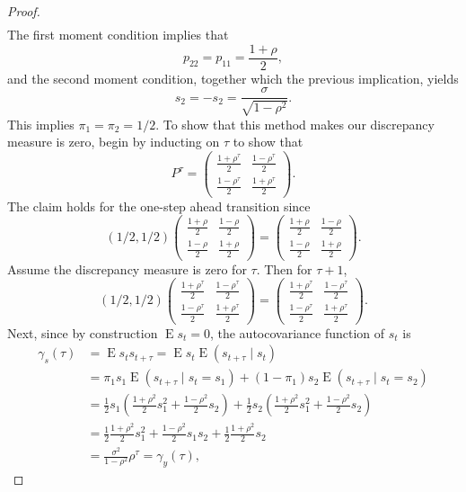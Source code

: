\documentclass[oneside,reqno]{amsart}
\DeclareMathOperator{\E}{E}
\theoremstyle{definition}
\begin{document}
\begin{enumerate}[label=(\roman*)]
\begin{proof}
\begin{align*}
\end{align*}
The first moment condition implies that 
\[
	p_{22} = p_{11} = \frac{1+\rho}{2},
\]
and the second moment condition, together which the previous implication, yields 
\[
	s_2 = -s_2 = \frac{\sigma}{\sqrt{1-\rho^2}}.
\]
This implies $\pi_1 = \pi_2 = 1/2$. To show that this method makes our discrepancy measure is zero, begin by inducting on $\tau$ to show that
\[
	P^\tau = \begin{pmatrix}
		\frac{1+\rho^\tau}{2} & \frac{1- \rho^\tau}{2} \\
		\frac{1-\rho^\tau}{2} & \frac{1+ \rho^\tau}{2}
	\end{pmatrix}.
\] 
The claim holds for the one-step ahead transition since
\[
	(1/2, 1/2)
	\begin{pmatrix}
		\frac{1+\rho}{2} & \frac{1- \rho}{2} \\
		\frac{1-\rho}{2} & \frac{1+ \rho}{2}
	\end{pmatrix}
	=\begin{pmatrix}
		\frac{1+\rho}{2} & \frac{1- \rho}{2} \\
		\frac{1-\rho}{2} & \frac{1+ \rho}{2}
	\end{pmatrix}.
\]
Assume the discrepancy measure is zero for $\tau$. Then for $\tau+1$,
\[
	(1/2, 1/2)
	\begin{pmatrix}
		\frac{1+\rho^\tau}{2} & \frac{1- \rho^\tau}{2} \\
		\frac{1-\rho^\tau}{2} & \frac{1+ \rho^\tau}{2}
	\end{pmatrix}
	=\begin{pmatrix}
		\frac{1+\rho^\tau}{2} & \frac{1- \rho^\tau}{2} \\
		\frac{1-\rho^\tau}{2} & \frac{1+ \rho^\tau}{2}
	\end{pmatrix}.
\]
Next, since by construction $\E s_t = 0$, the autocovariance function of $s_t$ is 
\begin{align*}
	\gamma_s(\tau) &= \E s_ts_{t+\tau} = \E s_t \E (s_{t+\tau} \mid s_t) \\
		&= \pi_1 s_1 \E (s_{t+\tau} \mid s_t = s_1) +  (1-\pi_1) s_2 \E (s_{t+\tau} \mid s_t = s_2) \\
		&= \frac{1}{2} s_1 \left(\frac{1+\rho^2}{2} s_1^2 + \frac{1-\rho^2}{2} s_2\right) + \frac{1}{2} s_2 \left(\frac{1+\rho^2}{2} s_1^2 + \frac{1-\rho^2}{2} s_2 \right) \\
		&= \frac{1}{2} \frac{1+\rho^2}{2} s_1^2 + \frac{1-\rho^2}{2} s_1s_2 + \frac{1}{2} \frac{1+\rho^2}{2} s_2 \\
		&= \frac{\sigma^2}{1-\rho^2}\rho^\tau = \gamma_y(\tau),

\end{align*}
\end{proof}
\end{enumerate}
\end{document}
